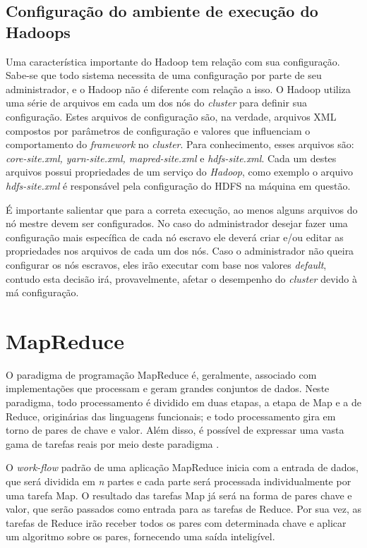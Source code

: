 \subsection{Configuração do ambiente de execução do Hadoops}
Uma característica importante do Hadoop tem relação com sua configuração. Sabe-se que todo sistema necessita de uma configuração por parte de seu administrador, e o Hadoop não é diferente com relação a isso. O Hadoop utiliza uma série de arquivos em cada um dos nós do \textit{cluster} para definir sua configuração. Estes arquivos de configuração são, na verdade, arquivos XML compostos por parâmetros de configuração e valores que influenciam o comportamento do \textit{framework} no \textit{cluster}. Para conhecimento, esses arquivos são: \emph{core-site.xml, yarn-site.xml, mapred-site.xml} e \emph{hdfs-site.xml}. Cada um destes arquivos possui propriedades de um serviço do \emph{Hadoop}, como exemplo o arquivo \emph{hdfs-site.xml} é responsável pela configuração do HDFS na máquina em questão. 

É importante salientar que para a correta execução, ao menos alguns arquivos do nó mestre devem ser configurados. No caso do administrador desejar fazer uma configuração mais específica de cada nó escravo ele deverá criar e/ou editar as propriedades nos arquivos de cada um dos nós. Caso o administrador não queira configurar os nós escravos, eles irão executar com base nos valores \textit{default}, contudo esta decisão irá, provavelmente, afetar o desempenho do \textit{cluster} devido à má configuração.

\section{MapReduce}
O paradigma de programação MapReduce é, geralmente, associado com implementações que processam e geram grandes conjuntos de dados. Neste paradigma, todo processamento é dividido em duas etapas, a etapa de Map e a de Reduce, originárias das linguagens funcionais; e todo processamento gira em torno de pares de chave e valor. Além disso, é possível de expressar uma vasta gama de tarefas reais por meio deste paradigma \cite{Dean}.

O \textit{work-flow} padrão de uma aplicação MapReduce inicia com a entrada de dados, que será dividida em \textit{n} partes e cada parte será processada individualmente por uma tarefa Map. O resultado das tarefas Map já será na forma de pares chave e valor, que serão passados como entrada para as tarefas de Reduce. Por sua vez, as tarefas de Reduce irão receber todos os pares com determinada chave e aplicar um algoritmo sobre os pares, fornecendo uma saída inteligível.


